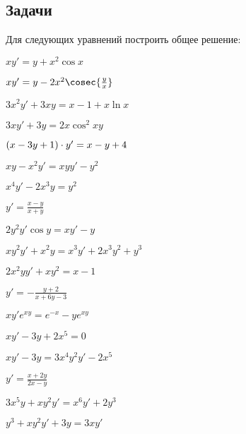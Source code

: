 \subsection{Задачи}
	
	Для следующих уравнений построить общее решение:
	\begin{multicols}{2}
		\begin{enumtasks}

			\item \( xy' = y + x^2 \cos{x} \) 														%
			\item \( xy' = y - 2x^2 \cosec{\frac{y}{x}} \) 											%
			\item \( 3x^2 y' + 3xy = x - 1 + x\ln{x} \) 											%
			\item \( 3xy' + 3y = 2x \cos^2{xy} \) 													%
			\item \( \left( x - 3y + 1 \right) \cdot y' = x - y + 4 \) 									%
			\item \( xy - x^2y' = xyy' - y^2 \) 													%
			\item \( x^4 y' - 2x^3 y = y^2 \) 														%
			\item \( y' = \frac{x - y}{x + y} \)													%
			\item \( 2y^2 y' \cos{y} = xy' - y \) 													%
			\item \( xy^2 y' + x^2 y = x^3y' + 2x^3 y^2 + y^3 \) 									%
			\item \( 2x^2 y y' + xy^2 = x - 1 \) 													%
			\item \( y' = - \frac{y + 2}{x + 6y - 3} \) 											%
			\item \( xy' e^{xy} = e^{-x} - ye^{xy} \)												%
			\item \( xy' - 3y + 2x^5 = 0 \) 														%
			\item \( xy' - 3y = 3x^4 y^2 y' - 2x^5 \) 												%
			\item \( y' = \frac{x + 2y}{2x - y} \)													%
			\item \( 3x^5 y + xy^2 y' = x^6 y' + 2y^3 \) 											%
			\item \( y^3 + xy^2 y' + 3y = 3xy' \) 													%

\end{enumtasks}
\end{multicols}
